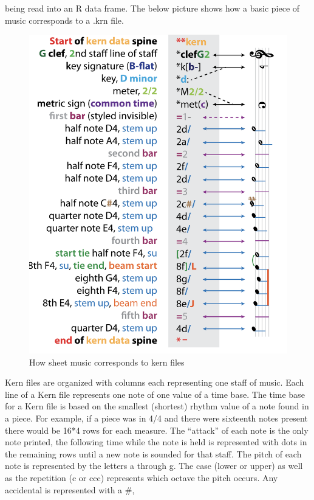 \documentclass[12pt,twoside]{reedthesis}
\theoremstyle{definition}
\theoremstyle{definition}
\theoremstyle{definition}
\theoremstyle{remark}
\begin{document}
being read into an R data frame. The below picture shows how a basic
piece of music corresponds to a .krn file.
\begin{figure}[h]
\centering
\includegraphics[scale=.50]{images/krnmusic.png}
\caption{How sheet music corresponds to kern files}
\label{subd}
\end{figure}
Kern files are organized with columns each representing one staff of
music. Each line of a Kern file represents one note of one value of a
time base. The time base for a Kern file is based on the smallest
(shortest) rhythm value of a note found in a piece. For example, if a
piece was in 4/4 and there were sixteenth notes present there would be
16*4 rows for each measure. The ``attack'' of each note is the only note
printed, the following time while the note is held is represented with
dots in the remaining rows until a new note is sounded for that staff.
The pitch of each note is represented by the letters a through g. The
case (lower or upper) as well as the repetition (c or ccc) represents
which octave the pitch occurs. Any accidental is represented with a \#,
\end{document}

